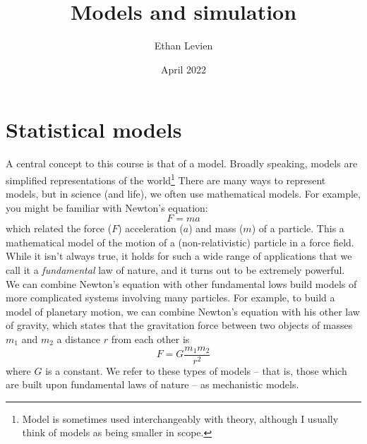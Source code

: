 

\title{\Huge \color{C1} Models and simulation}
\author{\color{C1} Ethan Levien}
\date{April 2022}



\maketitle

\tableofcontents



\section{Statistical models}

A central concept to this course is that of a {\dfn model}. %
Broadly speaking, models are simplified representations of the world\footnote{Model is sometimes used interchangeably with {\dfn theory}, although I usually think of models as being smaller in scope.} There are many ways to represent models, but in science (and life), we often use {\dfn mathematical models}.
For example, you might be familiar with Newton's equation:
\begin{equation}\label{eq:fma}
F = ma
\end{equation}
which related the force ($F$) acceleration ($a$) and mass ($m$) of a particle. This a mathematical model of the motion of a  (non-relativistic) particle in a force field. While it isn't always true, it holds for such a wide range of applications that we call it a \emph{fundamental} law of nature, and it turns out to be extremely powerful. We can combine Newton's equation with other fundamental lows build models of more complicated systems involving many particles. For example, to build a model of planetary motion, we can combine Newton's equation with his other law of gravity, which states that the gravitation force between two objects of masses $m_1$ and $m_2$ a distance $r$ from each other is
\begin{equation}
F = G\frac{m_1m_2}{r^2}
\end{equation}
where $G$ is a constant.
We refer to these types of models -- that is, those which are built upon fundamental laws of nature -- as {\dfn mechanistic} models.


